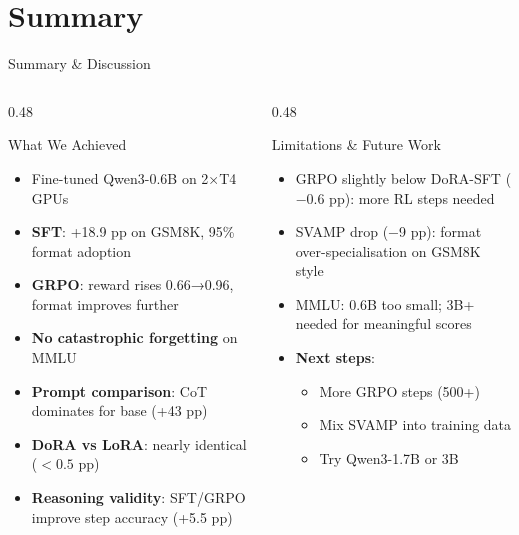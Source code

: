 \documentclass[aspectratio=169,10pt]{beamer}
\begin{document}
\section{Summary}
\begin{frame}{Summary \& Discussion}

  \begin{columns}[T]
    \begin{column}{0.48\textwidth}
      \begin{block}{What We Achieved}
        \begin{itemize}
          \item Fine-tuned Qwen3-0.6B on 2×T4 GPUs
          \item \textbf{SFT}: +18.9 pp on GSM8K, 95\% format adoption
          \item \textbf{GRPO}: reward rises 0.66→0.96, format improves further
          \item \textbf{No catastrophic forgetting} on MMLU
          \item \textbf{Prompt comparison}: CoT dominates for base (+43 pp)
          \item \textbf{DoRA vs LoRA}: nearly identical ($<0.5$ pp)
          \item \textbf{Reasoning validity}: SFT/GRPO improve step accuracy (+5.5 pp)
        \end{itemize}
      \end{block}
    \end{column}

    \begin{column}{0.48\textwidth}
      \begin{block}{Limitations \& Future Work}
        \begin{itemize}
          \item GRPO slightly below DoRA-SFT ($-$0.6 pp): more RL steps needed
          \item SVAMP drop ($-$9 pp): format over-specialisation on GSM8K style
          \item MMLU: 0.6B too small; 3B+ needed for meaningful scores
          \item \textbf{Next steps}:
            \begin{itemize}\small
              \item More GRPO steps (500+)
              \item Mix SVAMP into training data
              \item Try Qwen3-1.7B or 3B
            \end{itemize}
        \end{itemize}
      \end{block}
    \end{column}
  \end{columns}

  \vspace{0.5em}
  
\end{frame}
\end{document}
